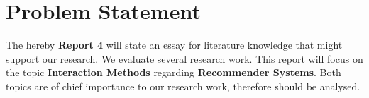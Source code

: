 \section{Problem Statement}

The hereby \textbf{Report 4} will state an essay for literature knowledge that might support our research. We evaluate several research work. This report will focus on the topic \textbf{Interaction Methods} regarding \textbf{Recommender Systems}. Both topics are of chief importance to our research work, therefore should be analysed.